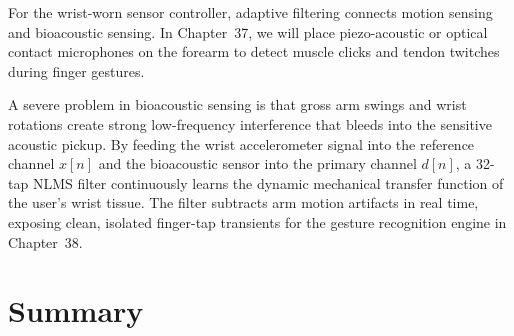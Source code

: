 \begin{goalbox}
For the wrist-worn sensor controller, adaptive filtering connects motion sensing and bioacoustic sensing. In Chapter~37, we will place piezo-acoustic or optical contact microphones on the forearm to detect muscle clicks and tendon twitches during finger gestures. 

A severe problem in bioacoustic sensing is that gross arm swings and wrist rotations create strong low-frequency interference that bleeds into the sensitive acoustic pickup. By feeding the wrist accelerometer signal into the reference channel $x[n]$ and the bioacoustic sensor into the primary channel $d[n]$, a 32-tap NLMS filter continuously learns the dynamic mechanical transfer function of the user's wrist tissue. The filter subtracts arm motion artifacts in real time, exposing clean, isolated finger-tap transients for the gesture recognition engine in Chapter~38.
\end{goalbox}

\section{Summary}
\label{ch17:summary}

